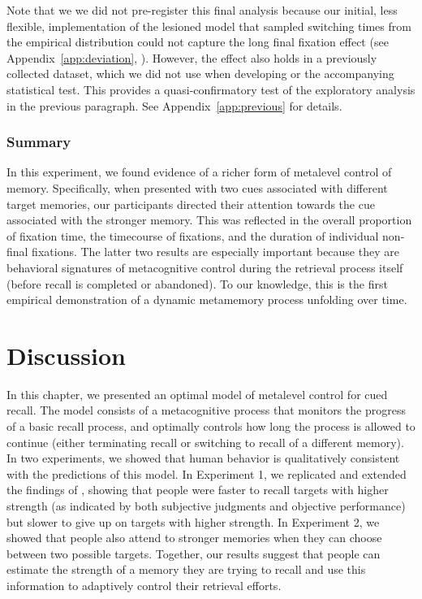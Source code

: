 Note that we we did not pre-register this final analysis because our initial, less flexible, implementation of the lesioned model that sampled switching times from the empirical distribution could not capture the long final fixation effect (see Appendix~\ref{app:deviation}, ). However, the effect also holds in a previously collected dataset, which we did not use when developing  or the accompanying statistical test. This provides a quasi-confirmatory test of the exploratory analysis in the previous paragraph. See Appendix~\ref{app:previous} for details.

\subsubsection{Summary}

In this experiment, we found evidence of a richer form of metalevel control of memory. Specifically, when presented with two cues associated with different target memories, our participants directed their attention towards the cue associated with the stronger memory. This was reflected in the overall proportion of fixation time, the timecourse of fixations, and the duration of individual non-final fixations. The latter two results are especially important because they are behavioral signatures of metacognitive control during the retrieval process itself (before recall is completed or abandoned). To our knowledge, this is the first empirical demonstration of a dynamic metamemory process unfolding over time. 

\section{Discussion}

In this chapter, we presented an optimal model of metalevel control for cued recall. The model consists of a metacognitive process that monitors the progress of a basic recall process, and optimally controls how long the process is allowed to continue (either terminating recall or switching to recall of a different memory). In two experiments, we showed that human behavior is qualitatively consistent with the predictions of this model. In Experiment 1, we replicated and extended the findings of \citet{costermans1992confidence}, showing that people were faster to recall targets with higher strength (as indicated by both subjective judgments and objective performance) but slower to give up on targets with higher strength. In Experiment 2, we showed that people also attend to stronger memories when they can choose between two possible targets. Together, our results suggest that people can estimate the strength of a memory they are trying to recall and use this information to adaptively control their retrieval efforts.

